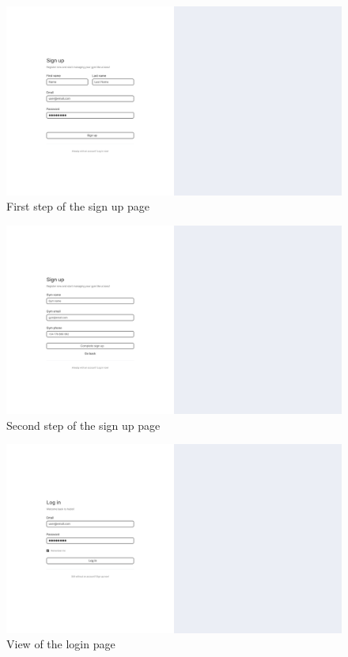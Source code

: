 \documentclass[a4paper, 12pt, oneside]{book}
\begin{document}
\begin{figure}[H]
	\centering
	\includegraphics[width=\textwidth]{assets/ui/sign-up-step-one.png}
	\caption{First step of the sign up page}
\end{figure}
\begin{figure}[H]
	\centering
	\includegraphics[width=\textwidth]{assets/ui/sign-up-step-two.png}
	\caption{Second step of the sign up page}
\end{figure}
\begin{figure}[H]
	\centering
	\includegraphics[width=\textwidth]{assets/ui/log-in.png}
	\caption{View of the login page}
\end{figure}
\end{document}
